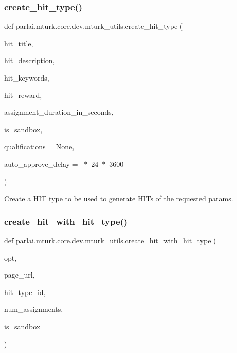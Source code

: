 \subsubsection{\texorpdfstring{create\+\_\+hit\+\_\+type()}{create\_hit\_type()}}
{\footnotesize\ttfamily def parlai.\+mturk.\+core.\+dev.\+mturk\+\_\+utils.\+create\+\_\+hit\+\_\+type (\begin{DoxyParamCaption}\item[{}]{hit\+\_\+title,  }\item[{}]{hit\+\_\+description,  }\item[{}]{hit\+\_\+keywords,  }\item[{}]{hit\+\_\+reward,  }\item[{}]{assignment\+\_\+duration\+\_\+in\+\_\+seconds,  }\item[{}]{is\+\_\+sandbox,  }\item[{}]{qualifications = {\ttfamily None},  }\item[{}]{auto\+\_\+approve\+\_\+delay = {~$\ast$~24~$\ast$~3600} }\end{DoxyParamCaption})}

\begin{DoxyVerb}Create a HIT type to be used to generate HITs of the requested params.
\end{DoxyVerb}
 \mbox{\label{namespaceparlai_1_1mturk_1_1core_1_1dev_1_1mturk__utils_a471ced1f7df897dcf3414dd49b84ddeb}} 
\subsubsection{\texorpdfstring{create\+\_\+hit\+\_\+with\+\_\+hit\+\_\+type()}{create\_hit\_with\_hit\_type()}}
{\footnotesize\ttfamily def parlai.\+mturk.\+core.\+dev.\+mturk\+\_\+utils.\+create\+\_\+hit\+\_\+with\+\_\+hit\+\_\+type (\begin{DoxyParamCaption}\item[{}]{opt,  }\item[{}]{page\+\_\+url,  }\item[{}]{hit\+\_\+type\+\_\+id,  }\item[{}]{num\+\_\+assignments,  }\item[{}]{is\+\_\+sandbox }\end{DoxyParamCaption})}

